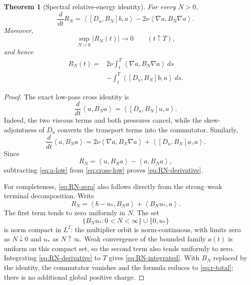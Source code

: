 \documentclass[11pt]{article}
\newtheorem{theorem}{Theorem}
\theoremstyle{remark}
\newcommand{\ip}[2]{\left\langle #1,#2\right\rangle}
\begin{document}
\begin{theorem}[Spectral relative-energy identity]
\label{thm:spectral}
For every \(N>0\),
\begin{equation}
\label{eq:RN-derivative}
 \frac{d}{dt}R_N
 =
 \ip{[D_u,B_N]b}{a}
 -2\nu\ip{\nabla a}{B_N\nabla a}.
\end{equation}
Moreover,
\begin{equation}
\label{eq:RN-zero}
 \sup_{N>0}|R_N(t)|\longrightarrow0
 \qquad(t\uparrow T),
\end{equation}
and hence
\begin{equation}
\label{eq:RN-integrated}
 \begin{aligned}
 R_N(t)
 ={}&
 2\nu\int_t^T\ip{\nabla a}{B_N\nabla a}\,ds\\
 &-\int_t^T\ip{[D_u,B_N]b}{a}\,ds.
 \end{aligned}
\end{equation}
\end{theorem}

\begin{proof}
The exact low-pass cross identity is
\begin{equation}
\label{eq:cross-low}
 \frac{d}{dt}\ip{u}{B_Na}
 =\ip{[D_u,B_N]u}{a}.
\end{equation}
Indeed, the two viscous terms and both pressures cancel, while
the skew-adjointness of \(D_u\) converts the transport terms into the
commutator.  Similarly,
\begin{equation}
\label{eq:a-low}
 \frac{d}{dt}\ip{a}{B_Na}
 =
 2\nu\ip{\nabla a}{B_N\nabla a}
 +\ip{[D_u,B_N]a}{a}.
\end{equation}
Since
\[
 R_N=\ip{u}{B_Na}-\ip{a}{B_Na},
\]
subtracting \eqref{eq:a-low} from \eqref{eq:cross-low} proves
\eqref{eq:RN-derivative}.

For completeness, \eqref{eq:RN-zero} also follows directly from the
strong--weak terminal decomposition.  Write
\[
 R_N=\ip{b-u_*}{B_Na}+\ip{B_Nu_*}{a}.
\]
The first term tends to zero uniformly in \(N\).  The set
\[
 \{B_Nu_*:0<N<\infty\}\cup\{0,u_*\}
\]
is norm compact in \(L^2\): the multiplier orbit is norm-continuous,
with limits zero as \(N\downarrow0\) and \(u_*\) as \(N\uparrow\infty\).
Weak convergence of the bounded family \(a(t)\) is uniform on this
compact set, so the second term also tends uniformly to zero.
Integrating \eqref{eq:RN-derivative} to \(T\) gives
\eqref{eq:RN-integrated}.  With \(B_N\) replaced by the identity, the
commutator vanishes and the formula reduces to
\eqref{eq:r-total}; there is no additional global positive charge.
\end{proof}
\end{document}
